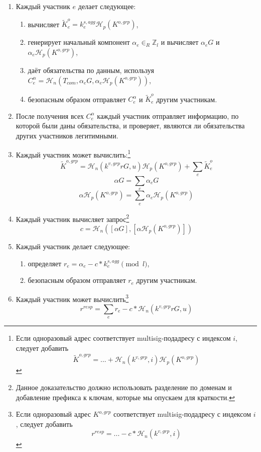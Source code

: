 \begin{enumerate}
    \item Каждый участник $e$ делает следующее:
    \begin{enumerate}
        \item вычисляет $\tilde{K}^{o}_{e} = k^{s,agg}_e \mathcal{H}_p(K^{o,grp})$,
        \item генерирует начальный компонент $\alpha_e \in_R \mathbb{Z}_l$ и вычисляет $\alpha_e G$ и $\alpha_e \mathcal{H}_p(K^{o,grp})$,
        \item даёт обязательства по данным, используя $C^{\alpha}_{e} = \mathcal{H}_n(T_{com}, \alpha_e G, \alpha_e \mathcal{H}_p(K^{o,grp}))$,
        \item безопасным образом отправляет $C^{\alpha}_{e}$ и $\tilde{K}^{o}_{e}$ другим участникам.
    \end{enumerate}
    \item После получения всех $C^{\alpha}_{e}$ каждый участник отправляет информацию, по которой были даны обязательства, и проверяет, являются ли обязательства других участников леги\-тимными.
    \item Каждый участник может вычислить:\footnote{Если одноразовый адрес соответствует multisig-подадресу с индексом $i$, следует добавить
    \[\tilde{K}^{o,grp} = ... + \mathcal{H}_n(k^{v,grp},i) \mathcal{H}_p(K^{o,grp})\]}\vspace{.175cm}
    \[\tilde{K}^{o,grp} = \mathcal{H}_n(k^{v,grp} r G, u) \mathcal{H}_p(K^{o,grp}) + \sum_e \tilde{K}^{o}_{e}\]
    \[\alpha G = \sum_e \alpha_{e} G\]
    \[\alpha \mathcal{H}_p(K^{o,grp}) = \sum_e \alpha_{e} \mathcal{H}_p(K^{o,grp})\]
    \item Каждый участник вычисляет запрос\footnote{Данное доказательство должно использовать разделение по доменам и добавление префикса к ключам, которые мы опускаем для краткости.}\vspace{.175cm}
    \[c = \mathcal{H}_n([\alpha G],[\alpha \mathcal{H}_p(K^{o,grp})])\]
    \item Каждый участник делает следующее:
    \begin{enumerate}
        \item определяет $r_e = \alpha_e - c*k^{s,agg}_e \pmod l$,
        \item безопасным образом отправляет $r_e$ другим участникам.
    \end{enumerate}
    \item Каждый участник может вычислить\footnote{Если одноразовый адрес $K^{o,grp}$ соответствует multisig-подадресу с индексом $i$, следует добавить
    \[r^{resp} = ... - c*\mathcal{H}_n(k^{v,grp},i)\]}\vspace{.175cm}
    \[r^{resp} = \sum_e r_e - c*\mathcal{H}_n(k^{v,grp} r G, u)\]
\end{enumerate}

